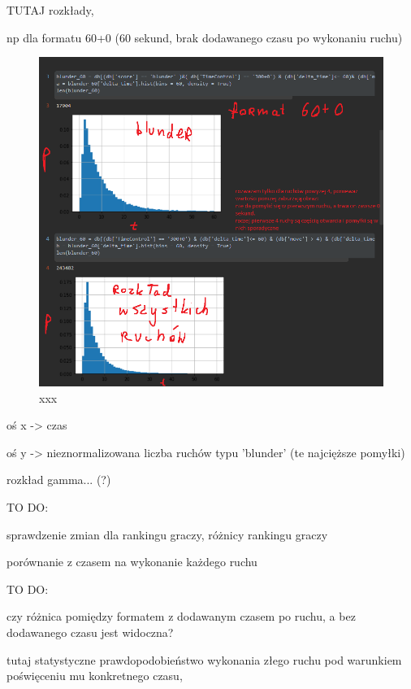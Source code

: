 \documentclass[inzynierska]{pwr_wmat_praca_dyplomowa}
\theoremstyle{plain}
\numberwithin{theorem}{chapter}
\theoremstyle{definition}
\numberwithin{theorem}{chapter}
\begin{document}
TUTAJ rozkłady, 	

np dla formatu 60+0 (60 sekund, brak dodawanego czasu po wykonaniu ruchu)

\begin{figure}[H]
	\centering
	\includegraphics[width=\textwidth]{sample60.png}
	\caption{xxx}\label{xxx}
\end{figure}


oś x -> czas

oś y -> nieznormalizowana liczba ruchów typu 'blunder' (te najcięższe pomyłki)\newline


rozkład gamma... (?)\newline 




TO DO: 

sprawdzenie zmian dla rankingu graczy, różnicy rankingu graczy

porównanie z czasem na wykonanie każdego ruchu\newline



TO DO: 

czy różnica pomiędzy formatem z dodawanym czasem po ruchu, a bez dodawanego czasu jest widoczna?




tutaj statystyczne prawdopodobieństwo wykonania złego ruchu pod warunkiem poświęceniu mu konkretnego czasu,\newline
\end{document}
